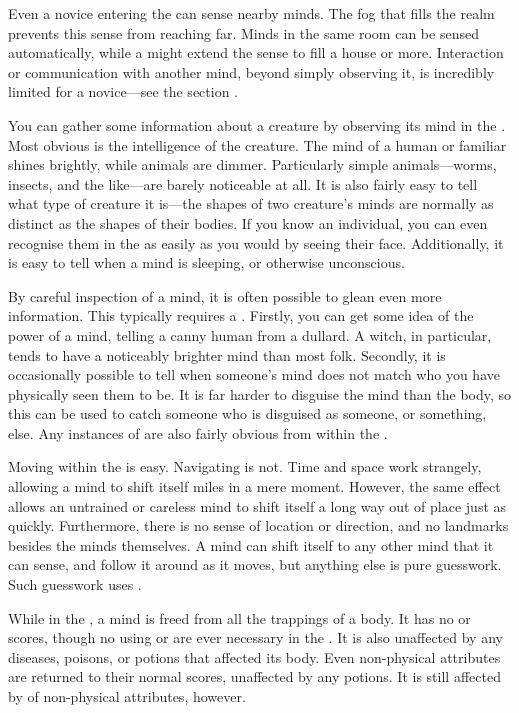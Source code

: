 Even a novice entering the {\mentalrealm} can sense nearby minds.
The fog that fills the realm prevents this sense from reaching far.
Minds in the same room can be sensed automatically, while a  might extend the sense to fill a house or more.
Interaction or communication with another mind, beyond simply observing it, is incredibly limited for a novice---see the section .

You can gather some information about a creature by observing its mind in the {\mentalrealm}.
Most obvious is the intelligence of the creature.
The mind of a human or familiar shines brightly, while animals are dimmer.
Particularly simple animals---worms, insects, and the like---are barely noticeable at all.
It is also fairly easy to tell what type of creature it is---the shapes of two creature's minds are normally as distinct as the shapes of their bodies.
If you know an individual, you can even recognise them in the {\mentalrealm} as easily as you would by seeing their face.
Additionally, it is easy to tell when a mind is sleeping, or otherwise unconscious.

By careful inspection of a mind, it is often possible to glean even more information.
This typically requires a  {\test}.
Firstly, you can get some idea of the power of a mind, telling a canny human from a dullard.
A witch, in particular, tends to have a noticeably brighter mind than most folk.
Secondly, it is occasionally possible to tell when someone's mind does not match who you have physically seen them to be.
It is far harder to disguise the mind than the body, so this can be used to catch someone who is disguised as someone, or something, else.
Any instances of {\possession} are also fairly obvious from within the {\mentalrealm}.

Moving within the {\mentalrealm} is easy.
Navigating is not.
Time and space work strangely, allowing a mind to shift itself miles in a mere moment.
However, the same effect allows an untrained or careless mind to shift itself a long way out of place just as quickly.
Furthermore, there is no sense of location or direction, and no landmarks besides the minds themselves.
A mind can shift itself to any other mind that it can sense, and follow it around as it moves, but anything else is pure guesswork.
Such guesswork uses  {\tests}.

While in the {\mentalrealm}, a mind is freed from all the trappings of a body.
It has no  or  scores, though no {\tests} using  or  are ever necessary in the {\mentalrealm}.
It is also unaffected by any diseases, poisons, or potions that affected its body.
Even non-physical attributes are returned to their normal scores, unaffected by any potions.
It is still affected by {\exhaustion} of non-physical attributes, however.

